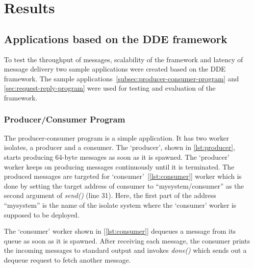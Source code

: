 \chapter{Results}
\label{chapter:results}

\section{Applications based on the DDE framework}
\label{sec:result-applications}
  To test the throughput of messages, scalability of the framework and latency of message delivery two sample applications were created based on the DDE framework. The sample applications~\autoref{subsec:producer-consumer-program} and
  \autoref{sec:request-reply-program} were used for testing and evaluation of the framework.

\subsection{Producer/Consumer Program}
\label{subsec:producer-consumer-program}
  The producer-consumer program is a simple application. It has two worker isolates, a producer and a consumer. The ‘producer’, shown in \autoref{lst:producer}, starts producing 64-byte messages as soon as it is spawned. The ‘producer’ worker keeps on producing messages continuously until it is terminated. The produced messages are targeted for ‘consumer’~[\autoref{lst:consumer}] worker which is done by setting the target address of consumer to “mysystem/consumer” as the second argument of \emph{send()} (line 31). Here, the first part of the address “mysystem” is the name of the isolate system where the ‘consumer’ worker is supposed to be deployed.

  The ‘consumer’ worker shown in [\autoref{lst:consumer}] dequeues a message from its queue as soon as it is spawned.  After receiving each message, the consumer prints the incoming messages to standard output and invokes \emph{done()} which sends out a dequeue request to fetch another message.

